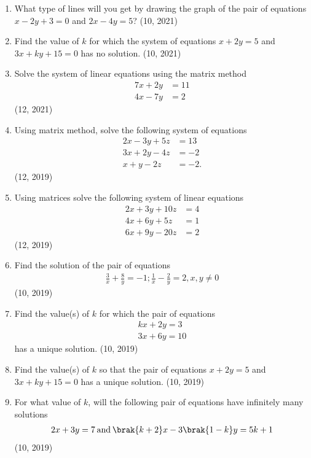 \begin{enumerate}[label=\thesubsection.\arabic*,ref=\thesubsection.\theenumi]
    \item What type of lines will you get by drawing the graph of the pair of equations $x - 2y + 3 = 0$ and $2x - 4y = 5$?
\hfill (10, 2021)
    \item Find the value of $k$ for which the system of equations $x + 2y = 5$ and $3x + ky + 15 = 0$ has no solution.
\hfill (10, 2021)
    \item Solve the system of linear equations using the matrix method
    \begin{align*}
        7x + 2y &= 11 \\
        4x - 7y &= 2
    \end{align*}
\hfill (12, 2021)
\item Using matrix method, solve the following system of equations 
\begin{align*}
    2x-3y+5z&=13\\
    3x+2y-4z &=-2\\
    x+y-2z&=-2.
\end{align*}
\hfill (12, 2019)
\item Using matrices solve the following system of linear equations
	\begin{align*}
		    2x+3y+10z&=4\\4x+6y+5z&=1\\6x+9y-20z&=2
	\end{align*}       
\hfill (12, 2019)
\item Find the solution of the pair of equations 
\begin{align*}
    \frac{3}{x}+\frac{8}{y}=-1; \frac{1}{x}-\frac{2}{y}=2, x, y\neq 0
\end{align*}
\hfill (10, 2019)

\item Find the value(s) of $k$ for which the pair of equations
\begin{align*}
    kx+2y=3\\
3x+6y=10
\end{align*}
has a unique solution.
\hfill (10, 2019)
 \item Find the value(s) of $k$ so that the pair of equations $x + 2y = 5$ and $3x + ky + 15 = 0$ has a unique solution.
\hfill (10, 2019)

 \item For what value of $k$, will the following pair of equations have infinitely many solutions 
\begin{align*}
	2x + 3y = 7 \hspace{2pt} \text{and} \hspace{2pt} \brak{k+2}x - 3\brak{1-k}y = 5k+1 
\end{align*}
\hfill (10, 2019)


\end{enumerate}
